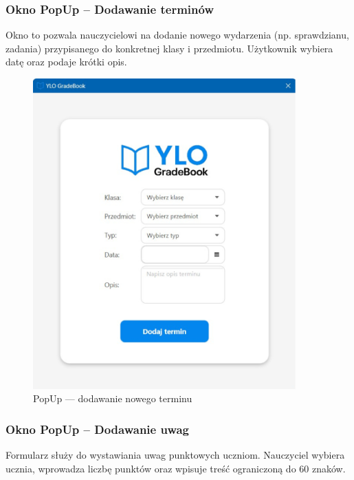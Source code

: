 \subsubsection{Okno PopUp – Dodawanie terminów}

Okno to pozwala nauczycielowi na dodanie nowego wydarzenia (np. sprawdzianu, zadania) przypisanego do konkretnej klasy i przedmiotu. Użytkownik wybiera datę oraz podaje krótki opis.

\begin{figure}[H]
    \centering
    \includegraphics[width=0.9\textwidth]{figures/fig_0017.eps}
    \caption{PopUp — dodawanie nowego terminu}
    \label{fig:popUpDeadLine}
\end{figure}
\newpage
\subsubsection{Okno PopUp – Dodawanie uwag}

Formularz służy do wystawiania uwag punktowych uczniom. Nauczyciel wybiera ucznia, wprowadza liczbę punktów oraz wpisuje treść ograniczoną do 60 znaków.

